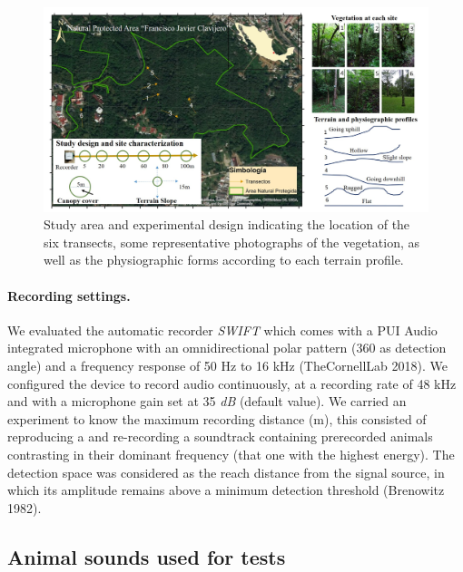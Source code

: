 \documentclass[fleqn,10pt,lineno]{wlpeerj} %
\begin{document}
\begin{figure}

{\centering \includegraphics[width=1\linewidth]{RD_studyarea} 

}

\caption{Study area and experimental design indicating the location of the six transects, some representative photographs of the vegetation, as well as the physiographic forms according to each terrain profile.\label{fig:studyarea}}\label{fig:studyarea}
\end{figure}

\paragraph{Recording settings.}

We evaluated the automatic recorder \emph{SWIFT} which comes with a PUI Audio integrated microphone with an omnidirectional polar pattern (360 as detection angle) and a frequency response of 50 Hz to 16 kHz (TheCornellLab 2018). We configured the device to record audio continuously, at a recording rate of 48 kHz and with a microphone gain set at 35 \emph{dB} (default value). We carried an experiment to know the maximum recording distance (m), this consisted of reproducing a and re-recording a soundtrack containing prerecorded animals contrasting in their dominant frequency (that one with the highest energy). The detection space was considered as the reach distance from the signal source, in which its amplitude remains above a minimum detection threshold (Brenowitz 1982).

\hypertarget{animal-sounds-used-for-tests}{%
\subsection*{Animal sounds used for tests}\label{animal-sounds-used-for-tests}}
\end{document}
